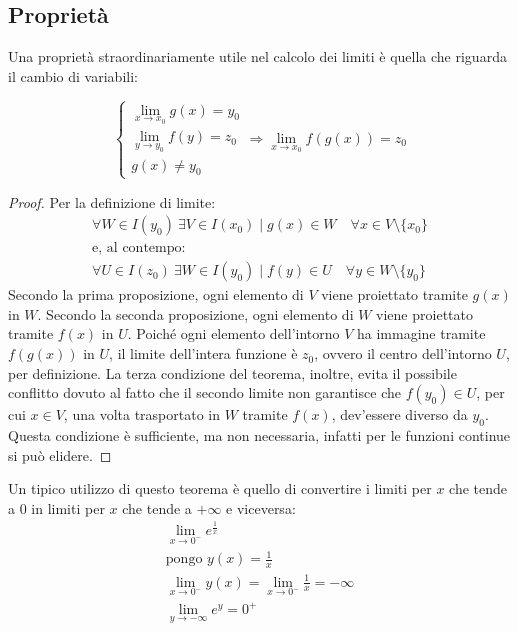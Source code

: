 \subsection{Proprietà}
Una proprietà straordinariamente utile nel calcolo dei limiti è quella che riguarda il cambio di variabili:
\begin{prop}
	\label{lim:var}
	\[
		\begin{cases}
			\displaystyle\lim_{x\to x_0} g(x)=y_0 \\
			\displaystyle\lim_{y\to y_0} f(y)=z_0 \\
			g(x)\neq y_0
		\end{cases}\Rightarrow
		\lim_{x\to x_0} f(g(x))=z_0
	\]
\end{prop}
\begin{proof}
	Per la definizione di limite:
	\begin{gather*}
		\forall W\in I(y_0) ~\exists V\in I(x_0)\mid g(x)\in W\quad\forall x\in V\setminus\{x_0\}\\
		\text{e, al contempo:}\\
		\forall U\in I(z_0) ~\exists W\in I(y_0)\mid f(y)\in U\quad\forall y\in W\setminus\{y_0\}
	\end{gather*}
	Secondo la prima proposizione, ogni elemento di $V$ viene proiettato tramite $g(x)$ in $W$. Secondo la seconda proposizione, ogni elemento di $W$ viene proiettato tramite $f(x)$ in $U$. Poiché ogni elemento dell'intorno $V$ ha immagine tramite $f(g(x))$ in $U$, il limite dell'intera funzione è $z_0$, ovvero il centro dell'intorno $U$, per definizione. La terza condizione del teorema, inoltre, evita il possibile conflitto dovuto al fatto che il secondo limite non garantisce che $f(y_0)\in U$, per cui $x\in V$, una volta trasportato in $W$ tramite $f(x)$, dev'essere diverso da $y_0$. Questa condizione è sufficiente, ma non necessaria, infatti per le funzioni continue si può elidere.
\end{proof}
\begin{examp}
	Un tipico utilizzo di questo teorema è quello di convertire i limiti per $x$ che tende a $0$ in limiti per $x$ che tende a $+\infty$ e viceversa:
	\begin{gather*}
		\lim_{x\to 0^-} e^{\frac{1}{x}}\\
		\text{pongo }y(x)=\frac{1}{x}\\
		\lim_{x\to 0^-} y(x)=\lim_{x\to 0^-} \frac{1}{x}=-\infty\\
		\lim_{y\to -\infty} e^y=0^+
	\end{gather*}
\end{examp}


